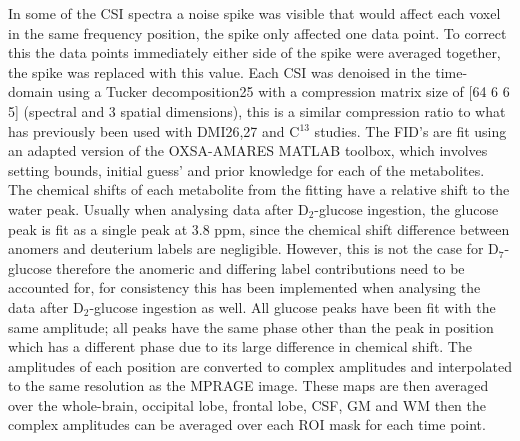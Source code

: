 \documentclass[class=article, crop=false]{standalone}
\begin{document}


In some of the CSI spectra a noise spike was visible that would affect each voxel in the same frequency position, the spike only affected one data point. To correct this the data points immediately either side of the spike were averaged together, the spike was replaced with this value. Each CSI was denoised in the time-domain using a Tucker decomposition25 with a compression matrix size of [64 6 6 5] (spectral and 3 spatial dimensions), this is a similar compression ratio to what has previously been used with DMI26,27 and C$^{13}$ studies\cite{Brender2019DynamicHyperpolarization}. The FID’s are fit using an adapted version of the OXSA-AMARES MATLAB toolbox\cite{Vanhamme1997ImprovedKnowledge, Purvis2017OXSA:MATLAB}, which involves setting bounds, initial guess’ and prior knowledge for each of the metabolites. The chemical shifts of each metabolite from the fitting have a relative shift to the water peak\cite{Meerwaldt2023InImaging}. Usually when analysing data after D$_2$-glucose ingestion, the glucose peak is fit as a single peak at 3.8 ppm, since the chemical shift difference between anomers and deuterium labels are negligible. However, this is not the case for D$_7$-glucose\cite{Govindaraju2000ProtonMetabolites} therefore the anomeric and differing label contributions need to be accounted for, for consistency this has been implemented when analysing the data after D$_2$-glucose ingestion as well. All glucose peaks have been fit with the same amplitude; all peaks have the same phase other than the peak in position which has a different phase due to its large difference in chemical shift. The amplitudes of each position are converted to complex amplitudes and interpolated to the same resolution as the MPRAGE image. These maps are then averaged over the whole-brain, occipital lobe, frontal lobe, CSF, GM and WM then the complex amplitudes can be averaged over each ROI mask for each time point.
\end{document}
